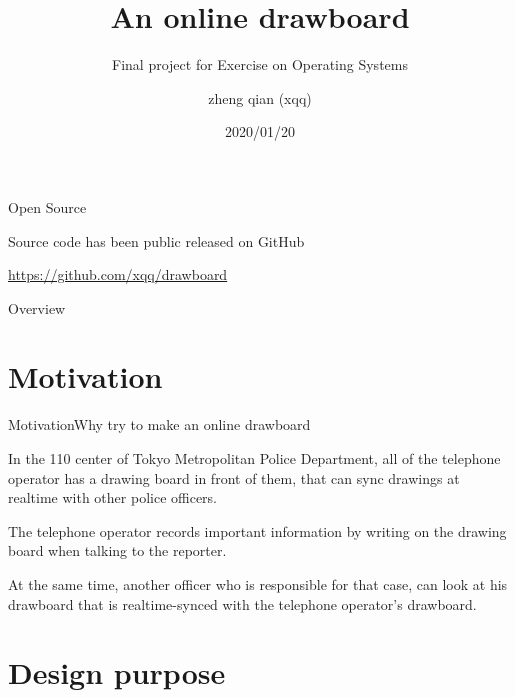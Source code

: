 \documentclass{beamer}
\title{An online drawboard}
\subtitle{Final project for Exercise on Operating Systems}
\author{zheng qian (xqq)}
\institute[SIT] %
{
  Department of Computer Science and Engineering\\
  Shibaura Institute of Technology
}
\date{2020/01/20}
\begin{document}
\begin{frame}
  \titlepage
\end{frame}

\begin{frame}{Open Source}
\begin{center}
Source code has been public released on GitHub
\end{center}
\begin{center}
\url{https://github.com/xqq/drawboard}
\end{center}
\end{frame}

\begin{frame}{Overview}
  \tableofcontents
\end{frame}

\section{Motivation}

\begin{frame}{Motivation}{Why try to make an online drawboard}

In the 110 center of Tokyo Metropolitan Police Department,
all of the telephone operator has a drawing board in front of them,
that can sync drawings at realtime with other police officers.

The telephone operator records important information by writing on the drawing board when talking to the reporter.

At the same time, another officer who is responsible for that case,
can look at his drawboard that is realtime-synced with the telephone operator's drawboard.

\end{frame}

\section{Design purpose}
\end{document}
